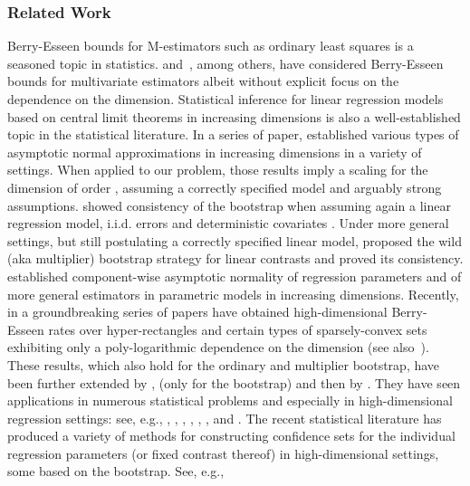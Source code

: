 \documentclass{article}
\begin{document}
\subsubsection*{Related Work}
Berry-Esseen bounds for M-estimators such as ordinary least squares is a seasoned topic in statistics. \cite{pfanzagl1973accuracy} and~\cite{paulauskas1996rates}, among others, have considered Berry-Esseen bounds for multivariate estimators albeit without explicit focus on the dependence on the dimension.
Statistical inference for linear regression models based on central limit theorems in increasing dimensions is also a well-established topic in the statistical literature.
In a series of paper, \cite{Portnoy84,Portnoy85,Portnoy86,Portnoy88} established
various types of asymptotic normal approximations in increasing dimensions in a variety of settings. When applied to our problem, those results imply a scaling for the dimension of order  , assuming a correctly specified model and arguably strong assumptions.
\cite{bickel1983bootstrapping}
showed
consistency of the bootstrap
when   assuming again a linear regression model, i.i.d. errors and deterministic covariates \cite{mammen1989}. Under more general settings, but still postulating a correctly specified linear model, \cite{mammen1993} proposed the wild (aka multiplier) bootstrap strategy \citep{liu1988} for linear contrasts and proved its consistency. \cite{He2000} \citep{welsh1989} established component-wise asymptotic normality of regression parameters and of more general estimators in parametric models in increasing dimensions.
Recently, in a groundbreaking series of papers \cite{Cher13,chernozhukov2017detailed, chernozhukov2019improved} have obtained high-dimensional Berry-Esseen rates over hyper-rectangles and certain types of sparsely-convex sets exhibiting only a poly-logarithmic dependence on the dimension (see also~\citet{MR1115160}). These results, which also hold for the ordinary and multiplier bootstrap,
have been further extended by
\cite{2018arXiv180606153K}, \cite{hang.hzhang.bootstrap.17} (only for the bootstrap)
and then by \cite{koike2019high}. They have seen applications in numerous statistical problems and especially in high-dimensional regression settings: see, e.g., \cite{zhang2014confidence}, \cite{wasserman2014berry}, \cite{10.1093/biomet/asu056},
\cite{doi:10.1146/annurev-economics-012315-015826}, \cite{zhang2017simultaneous}, \cite{test}, \cite{boot}
and \cite{hang.hzhang.bootstrap.17}.
The recent statistical literature has produced a variety of methods for constructing confidence sets for the individual regression parameters (or fixed contrast thereof) in high-dimensional settings, some based on the bootstrap. See, e.g.,
\end{document}
